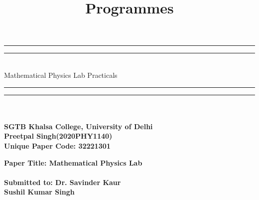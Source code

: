 \documentclass{article}
\title{Programmes}
\date{ }
\begin{document}
\begin{center}


\rule{\textwidth}{1.6pt}\vspace*{-\baselineskip}\vspace*{2pt} %
\rule{\textwidth}{0.4pt}\\[\baselineskip] %

{\LARGE Mathematical Physics Lab Practicals \\[0.2\baselineskip] }%

\rule{\textwidth}{0.4pt}\vspace*{-\baselineskip}\vspace{3.2pt} %
\rule{\textwidth}{1.6pt}\\[2\baselineskip] %




\textbf{\Large \\[\baselineskip] SGTB Khalsa College, University of Delhi}\\[\baselineskip]
\textbf{\Large Preetpal Singh(2020PHY1140)}\\[\baselineskip] 

\vspace*{\baselineskip}
\textbf{\Large Unique Paper Code: 32221301}\\[\baselineskip] 
\vspace*{\baselineskip}
 
\textbf{\Large Paper Title: Mathematical Physics Lab}\\[\baselineskip] 
\vspace*{\baselineskip}
\textbf{\Large \\[\baselineskip] Submitted to: Dr. Savinder Kaur}\\[\baselineskip]
\textbf{\Large Sushil Kumar Singh}\\[\baselineskip]

\end{center}
\newpage

\maketitle
  
\tableofcontents
\end{document}
